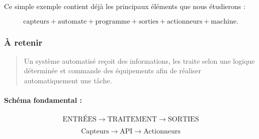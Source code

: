 \documentclass[12pt,a4paper]{book}
\begin{document}
Ce simple exemple contient déjà les principaux éléments que nous étudierons :

\[
\text{capteurs} + \text{automate} + \text{programme} + \text{sorties} + \text{actionneurs} + \text{machine}.
\]

\subsubsection*{À retenir}

\begin{quote}
Un système automatisé reçoit des informations, les traite selon une logique déterminée et commande des équipements afin de réaliser automatiquement une tâche.
\end{quote}

\paragraph{Schéma fondamental :}

\[
\text{ENTRÉES} \rightarrow \text{TRAITEMENT} \rightarrow \text{SORTIES}
\]

\[
\text{Capteurs} \rightarrow \text{API} \rightarrow \text{Actionneurs}
\]








\end{document}
